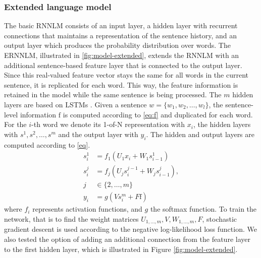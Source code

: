 \documentclass[a4paper]{article}
\begin{document}
\subsubsection{Extended language model}
The basic RNNLM consists of an input layer, a hidden layer with recurrent connections that maintains a representation of the sentence history, and an output layer which produces the probability distribution over words.
The ERNNLM, illustrated in \ref{fig:model-extended}, extends the RNNLM with an additional sentence-based feature layer that is connected to the output layer. Since this real-valued feature vector stays the same for all words in the current sentence, it is replicated for each word. This way, the feature information is retained in the model while the same sentence is being processed.
The $m$ hidden layers are based on LSTMs \cite{hochreiter1997long}.
Given a sentence $w = \{w_1, w_2, \ldots, w_l\}$, the sentence-level information $\text{f}$ is computed according to \eqref{eq:f} and duplicated for each word. For the $i$-th word we denote its 1-of-N representation with $x_i$, the hidden layers with $s^1, s^2, \dots, s^m$ and the output layer with $y_i$. The hidden and output layers are computed according to \eqref{eq}.
\begin{equation}
\label{eq}
\begin{aligned}
s^1_i &= f_1(U_1x_i + W_1s^1_{i-1}) \\
s^j_i &= f_j(U_js^{j-1}_i + W_js^j_{i-1}), \\j &\in \{2,\ldots,m\} \\
y_i &= g(Vs^m_i + F\text{f})
\end{aligned}
\end{equation}
where $f_i$ represents activation functions, and $g$ the softmax function.
To train the network, that is to find the weight matrices $U_{1,\dots,m}, V, W_{1,\dots,m}, F$, stochastic gradient descent is used according to the negative log-likelihood loss function. We also tested the option of adding an additional connection from the feature layer to the first hidden layer, which is illustrated in Figure \ref{fig:model-extended}.
\end{document}
